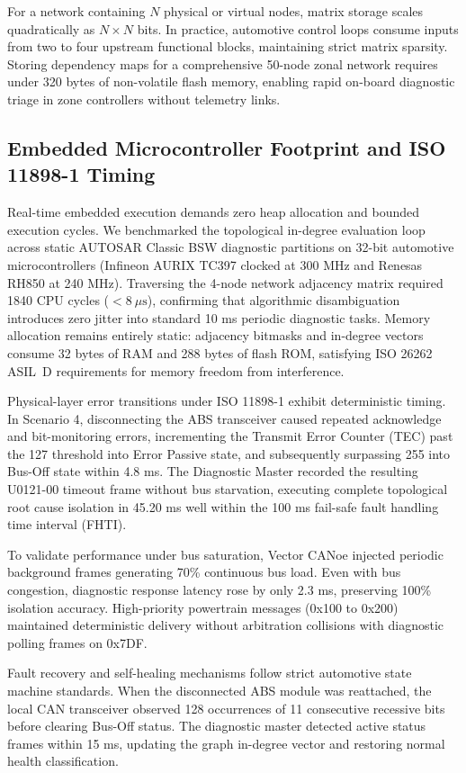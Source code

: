 \documentclass[conference]{IEEEtran}
\begin{document}
For a network containing $N$ physical or virtual nodes, matrix storage scales quadratically as $N \times N$ bits. In practice, automotive control loops consume inputs from two to four upstream functional blocks, maintaining strict matrix sparsity. Storing dependency maps for a comprehensive 50-node zonal network requires under 320 bytes of non-volatile flash memory, enabling rapid on-board diagnostic triage in zone controllers without telemetry links.

\subsection{Embedded Microcontroller Footprint and ISO 11898-1 Timing}
Real-time embedded execution demands zero heap allocation and bounded execution cycles. We benchmarked the topological in-degree evaluation loop across static AUTOSAR Classic BSW diagnostic partitions on 32-bit automotive microcontrollers (Infineon AURIX TC397 clocked at 300 MHz and Renesas RH850 at 240 MHz). Traversing the 4-node network adjacency matrix required 1840 CPU cycles ($<8~\mu\text{s}$), confirming that algorithmic disambiguation introduces zero jitter into standard 10 ms periodic diagnostic tasks. Memory allocation remains entirely static: adjacency bitmasks and in-degree vectors consume 32 bytes of RAM and 288 bytes of flash ROM, satisfying ISO 26262 ASIL~D requirements for memory freedom from interference.

Physical-layer error transitions under ISO 11898-1 exhibit deterministic timing. In Scenario 4, disconnecting the ABS transceiver caused repeated acknowledge and bit-monitoring errors, incrementing the Transmit Error Counter (TEC) past the 127 threshold into Error Passive state, and subsequently surpassing 255 into Bus-Off state within 4.8 ms. The Diagnostic Master recorded the resulting U0121-00 timeout frame without bus starvation, executing complete topological root cause isolation in 45.20 ms well within the 100 ms fail-safe fault handling time interval (FHTI).

To validate performance under bus saturation, Vector CANoe injected periodic background frames generating 70\% continuous bus load. Even with bus congestion, diagnostic response latency rose by only 2.3 ms, preserving 100\% isolation accuracy. High-priority powertrain messages (0x100 to 0x200) maintained deterministic delivery without arbitration collisions with diagnostic polling frames on 0x7DF.

Fault recovery and self-healing mechanisms follow strict automotive state machine standards. When the disconnected ABS module was reattached, the local CAN transceiver observed 128 occurrences of 11 consecutive recessive bits before clearing Bus-Off status. The diagnostic master detected active status frames within 15 ms, updating the graph in-degree vector and restoring normal health classification.
\end{document}
